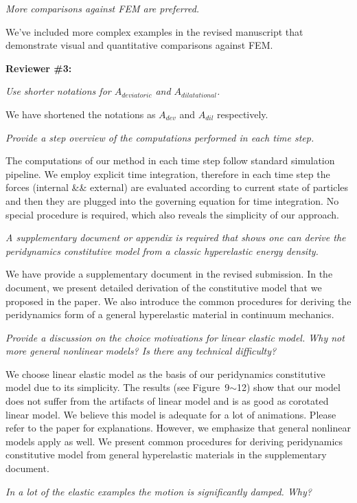 \emph{More comparisons against FEM are preferred.}

We've included more complex examples in the revised manuscript that demonstrate visual and quantitative comparisons against FEM.

\noindent{}\textbf{Reviewer \#3:}

\emph{Use shorter notations for $A_{deviatoric}$ and $A_{dilatational}$.}

We have shortened the notations as $A_{dev}$ and $A_{dil}$ respectively.

\emph{Provide a step overview of the computations performed in each time step.}

The computations of our method in each time step follow standard simulation pipeline. We employ explicit time integration, therefore in each time step the forces (internal \&\& external) are evaluated according to current state of particles and then they are plugged into the governing equation for time integration. No special procedure is required, which also reveals the simplicity of our approach.

\emph{A supplementary document or appendix is required that shows one can derive the peridynamics constitutive model from a classic hyperelastic energy density.}

We have provide a supplementary document in the revised submission. In the document, we present detailed derivation of the constitutive model that we proposed in the paper. We also introduce the common procedures for deriving the peridynamics form of a general hyperelastic material in continuum mechanics.

\emph{Provide a discussion on the choice motivations for linear elastic model. Why not more general nonlinear models? Is there any technical difficulty?}

We choose linear elastic model as the basis of our peridynamics constitutive model due to its simplicity. The results (see Figure~9$\sim$12) show that our model does not suffer from the artifacts of linear model and is as good as corotated linear model. We believe this model is adequate for a lot of animations. Please refer to the paper for explanations. However, we emphasize that general nonlinear models apply as well. We present common procedures for deriving peridynamics constitutive model from general hyperelastic materials in the supplementary document.

\emph{In a lot of the elastic examples the motion is significantly damped. Why?}

